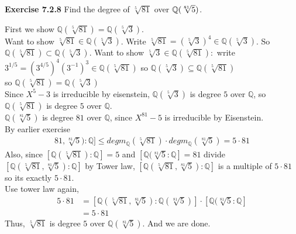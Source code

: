 \documentclass{article}
\begin{document}
\pagebreak

\begin{homeworkProblem}
    \textbf{Exercise 7.2.8} Find the degree of $\sqrt[5]{81}$ over $\mathbb{Q}(\sqrt[81]{5})$.

    \solution

    First we show $\mathbb{Q}(\sqrt[5]{81}) = \mathbb{Q}(\sqrt[5]{3})$.\\
    Want to show $\sqrt[5]{81} \in \mathbb{Q}(\sqrt[5]{3})$. 
    Write $\sqrt[5]{81} = (\sqrt[5]{3})^4 \in \mathbb{Q}(\sqrt[5]{3})$.
    So $\mathbb{Q}(\sqrt[5]{81}) \subset \mathbb{Q}(\sqrt[5]{3})$.
    Want to show $\sqrt[5]{3} \in \mathbb{Q}(\sqrt[5]{81}):$
    write $3^{1/5} = \left( 3^{4/5} \right)^4 (3^{-1})^3 \in \mathbb{Q} \left( \sqrt[5]{81} \right)$
    so $\mathbb{Q}(\sqrt[5]{3}) \subseteq \mathbb{Q}(\sqrt[5]{81})$\\
    so $\mathbb{Q}(\sqrt[5]{81}) = \mathbb{Q}(\sqrt[5]{3})$\\
    Since $X^5 - 3$ is irreducible by eisenstein, 
    $\mathbb{Q}(\sqrt[5]{3})$ is degree $5$ over $\mathbb{Q}$,
    so $\mathbb{Q}(\sqrt[5]{81})$ is degree $5$ over $\mathbb{Q}$.\\
    $\mathbb{Q}(\sqrt[81]{5})$ is degree $81$ over $\mathbb{Q}$,
    since $X^{81} - 5$ is irreducible by Eisenstein.\\
    By earlier exercise
    \begin{align}
        [\mathbb{Q}(\sqrt[5]{81}, \sqrt[81]{5}) : \mathbb{Q}] 
        \leq deg m_{\mathbb{Q}}(\sqrt[5]{81}) \cdot deg m_{\mathbb{Q}}(\sqrt[81]{5}) = 5 \cdot 81
    \end{align}
    Also, since $[\mathbb{Q}(\sqrt[5]{81}):\mathbb{Q}] = 5$ and
    $[\mathbb{Q}(\sqrt[81]{5}: \mathbb{Q}] = 81$ divide
    $[\mathbb{Q}(\sqrt[5]{81}, \sqrt[81]{5}) : \mathbb{Q}]$
    by Tower law, $[\mathbb{Q}(\sqrt[5]{81}, \sqrt[81]{5}): \mathbb{Q}]$
    is a multiple of $5 \cdot 81$ so its exactly $5 \cdot 81$.\\
    Use tower law again,
    \begin{align}
        5 \cdot 81 &= [\mathbb{Q}(\sqrt[5]{81},\sqrt[81]{5}): \mathbb{Q}(\sqrt[81]{5})]
        \cdot \left[ \mathbb{Q}(\sqrt[81]{5} : \mathbb{Q} \right]\\
        &= 5 \cdot 81
    \end{align}
    Thus, $\sqrt[5]{81}$ is degree $5$ over $\mathbb{Q}(\sqrt[81]{5})$. 
    And we are done.
    
    


    



\end{homeworkProblem}
\end{document}
